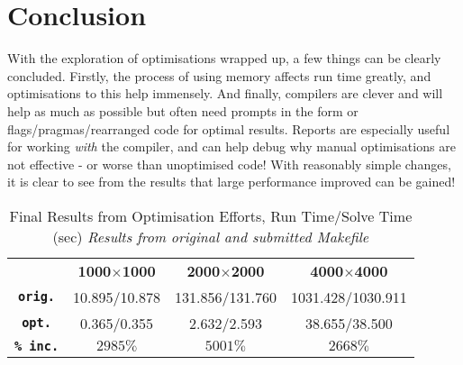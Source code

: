 \documentclass[10pt,twocolumn,a4paper]{article}
\begin{document}
\vspace{-0.1cm}
\section{Conclusion}
With the exploration of optimisations wrapped up, a few things can be clearly concluded. Firstly, the process of using memory affects run time greatly, and optimisations to this help immensely. And finally, compilers are clever and will help as much as possible but often need prompts in the form or flags/pragmas/rearranged code for optimal results. Reports are especially useful for working \textit{with} the compiler, and can help debug why manual optimisations are not effective - or worse than unoptimised code! With reasonably simple changes, it is clear to see from the results that large performance improved can be gained!

\vspace{-0.2cm}
\begin{table}[h]
\begin{adjustwidth}{-0.15cm}{}
\small
\centering
\begin{tabular}{c|c|c|c}
    & \textbf{1000$\times$1000} & \textbf{2000$\times$2000} & \textbf{4000$\times$4000}   \\
\textbf{\texttt{orig.}} & 10.895/10.878 & 131.856/131.760 & 1031.428/1030.911 \\
\textbf{\texttt{opt.}} & 0.365/0.355 & 2.632/2.593 & 38.655/38.500 \\
\textbf{\texttt{\% inc.}} & $2985\%$ & $5001\%$ & $2668\%$ \\
\end{tabular}
\caption{Final Results from Optimisation Efforts, \newline Run Time/Solve Time (sec) \newline\textit{Results from original\cite{hpc-cw1-code} and submitted Makefile }}
\label{finalResults}
\end{adjustwidth}
\end{table}\par
\vspace{-0.22cm}

\vspace{-0.3cm}
\printbibliography[title={Bibliography}]
\end{document}

